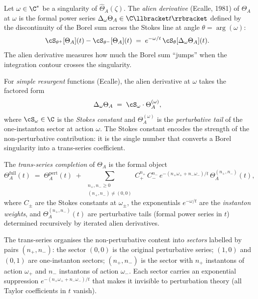 \begin{definition}
\label{def:alien-derivative}
%
%
Let $\omega \in \C^*$ be a singularity of $\hat{\Theta}_A(\zeta)$. The \emph{alien derivative} (Ecalle, 1981) of $\Theta_A$ at $\omega$ is the formal power series $\Delta_\omega \Theta_A \in \C\llbracket t \rrbracket$ defined by the discontinuity of the Borel sum across the Stokes line at angle $\theta = \arg(\omega)$:
\[
 \cS_{\theta^+}[\Theta_A](t) - \cS_{\theta^-}[\Theta_A](t) \;=\; e^{-\omega/t}\, \cS_\theta[\Delta_\omega \Theta_A](t).
\]
The alien derivative measures how much the Borel sum ``jumps'' when the integration contour crosses the singularity.

For \emph{simple resurgent} functions (Ecalle), the alien derivative at $\omega$ takes the factored form
\[
 \Delta_\omega \Theta_A \;=\; \cS_\omega \cdot \Theta_A^{(\omega)},
\]
where $\cS_\omega \in \C$ is the \emph{Stokes constant} and $\Theta_A^{(\omega)}$ is the \emph{perturbative tail} of the one-instanton sector at action $\omega$. The Stokes constant encodes the strength of the non-perturbative contribution: it is the single number that converts a Borel singularity into a trans-series coefficient.
\end{definition}

\begin{definition}
\label{def:trans-series}
%
The \emph{trans-series completion} of $\Theta_A$ is the formal object
\begin{equation}
\label{eq:trans-series-bridge}
 \Theta_A^{\mathrm{full}}(t) \;=\; \Theta_A^{\mathrm{pert}}(t) \;+\; \sum_{\substack{n_+, n_- \geq 0 \\ (n_+, n_-) \neq (0,0)}} C_+^{n_+}\, C_-^{n_-}\, e^{-(n_+ \omega_+ + n_- \omega_-)/t}\, \Theta_A^{(n_+, n_-)}(t),
\end{equation}
where $C_\pm$ are the Stokes constants at $\omega_\pm$, the exponentials $e^{-\omega/t}$ are the \emph{instanton weights}, and $\Theta_A^{(n_+, n_-)}(t)$ are perturbative tails (formal power series in $t$) determined recursively by iterated alien derivatives.

The trans-series organises the non-perturbative content into \emph{sectors} labelled by pairs $(n_+, n_-)$: the sector $(0,0)$ is the original perturbative series; $(1,0)$ and $(0,1)$ are one-instanton sectors; $(n_+, n_-)$ is the sector with $n_+$ instantons of action $\omega_+$ and $n_-$ instantons of action $\omega_-$. Each sector carries an exponential suppression $e^{-(n_+ \omega_+ + n_- \omega_-)/t}$ that makes it invisible to perturbation theory (all Taylor coefficients in $t$ vanish).
\end{definition}

